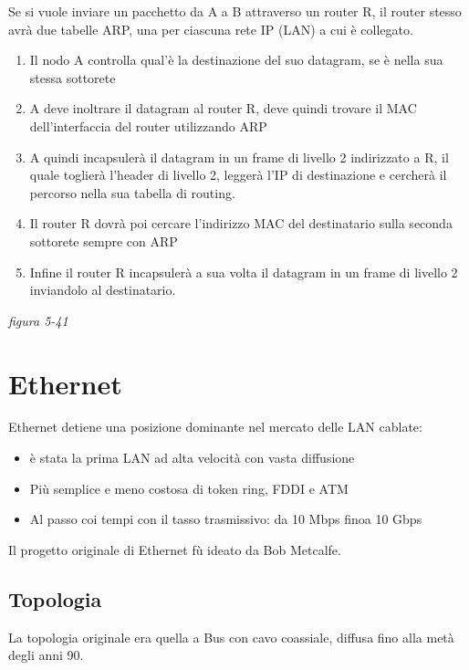 \documentclass[
]{article}
\begin{document}
Se si vuole inviare un pacchetto da A a B attraverso un router R, il
router stesso avrà due tabelle ARP, una per ciascuna rete IP (LAN) a cui
è collegato.

\begin{enumerate}
\def\labelenumi{\arabic{enumi}.}
\item
  Il nodo A controlla qual'è la destinazione del suo datagram, se è
  nella sua stessa sottorete
\item
  A deve inoltrare il datagram al router R, deve quindi trovare il MAC
  dell'interfaccia del router utilizzando ARP
\item
  A quindi incapsulerà il datagram in un frame di livello 2 indirizzato
  a R, il quale toglierà l'header di livello 2, leggerà l'IP di
  destinazione e cercherà il percorso nella sua tabella di routing.
\item
  Il router R dovrà poi cercare l'indirizzo MAC del destinatario sulla
  seconda sottorete sempre con ARP
\item
  Infine il router R incapsulerà a sua volta il datagram in un frame di
  livello 2 inviandolo al destinatario.
\end{enumerate}

\emph{figura 5-41}

\hypertarget{header-n135}{%
\section{Ethernet}\label{header-n135}}

Ethernet detiene una posizione dominante nel mercato delle LAN cablate:

\begin{itemize}
\item
  è stata la prima LAN ad alta velocità con vasta diffusione
\item
  Più semplice e meno costosa di token ring, FDDI e ATM
\item
  Al passo coi tempi con il tasso trasmissivo: da 10 Mbps finoa 10 Gbps
\end{itemize}

Il progetto originale di Ethernet fù ideato da Bob Metcalfe.

\hypertarget{header-n145}{%
\subsection{Topologia}\label{header-n145}}

La topologia originale era quella a Bus con cavo coassiale, diffusa fino
alla metà degli anni 90.
\end{document}

